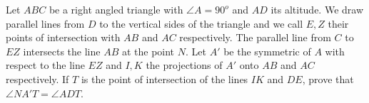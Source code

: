 Let $ABC$ be a right angled triangle with $\angle A = 90^o$ and $AD$ its altitude. We draw parallel lines from $D$ to the vertical sides of the triangle and we call $E, Z$ their points of intersection with $AB$ and $AC$ respectively. The parallel line from $C$ to $EZ$ intersects the line $AB$ at the point $N$. Let $A' $ be the symmetric of $A$ with respect to the line $EZ$ and $I, K$ the projections of $A'$ onto $AB$ and $AC$ respectively. If $T$ is the point of intersection of the lines $IK$ and $DE$,  prove that $\angle NA'T = \angle  ADT$.